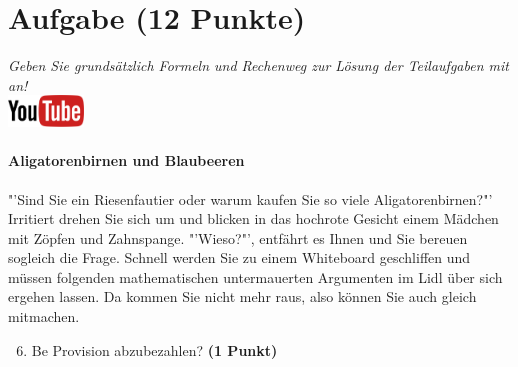 \section{Aufgabe \hfill (12 Punkte)}

\textit{Geben Sie grunds{\"a}tzlich Formeln und Rechenweg zur L{\"o}sung der
  Teilaufgaben mit an!} \\[1Ex]

\hfill\href{https://youtu.be/SZqp_vy3rgI}{\includegraphics[width = 2cm]{img/youtube}} %
\hspace{2Ex}

\paragraph{Aligatorenbirnen und Blaubeeren}


\begin{knitrout}
\color{fgcolor}\begin{kframe}
\begin{alltt}
 \hlkwb{<-} \hlstd{(}\hlstd{,} \hlstd{,}
            \hlstd{,} \hlstd{) |>}
  \hlstd{(}\hlstd{)}
 \hlkwb{<-} \hlstd{(}\hlstd{,} \hlstd{,} \hlstd{,} \hlstd{,} \hlstd{) |>} \hlstd{(}\hlstd{)}
\end{alltt}
\end{kframe}
\end{knitrout}

"'Sind Sie ein Riesenfautier oder warum kaufen Sie so viele Aligatorenbirnen?"' Irritiert drehen Sie sich um und blicken in das hochrote Gesicht einem Mädchen mit Zöpfen und Zahnspange. "'Wieso?"', entfährt es Ihnen und Sie bereuen sogleich die Frage. Schnell werden Sie zu einem Whiteboard geschliffen und müssen folgenden mathematischen untermauerten Argumenten im Lidl über sich ergehen lassen. Da kommen Sie nicht mehr raus, also können Sie auch gleich mitmachen.


\begin{enumerate}
  \setcounter{enumi}{5}
\item Be
  Provision abzubezahlen? \textbf{(1 Punkt)}
\end{enumerate}
